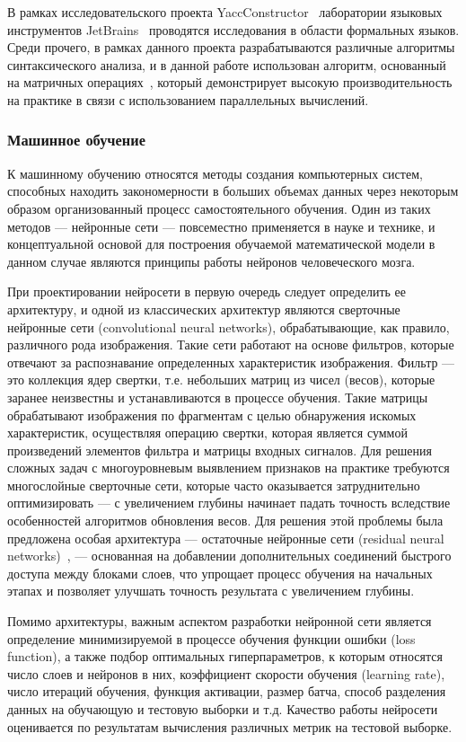 В рамках исследовательского проекта YaccConstructor~\cite{yacc} лаборатории языковых
инструментов JetBrains~\cite{jetbrains} проводятся исследования в области формальных языков. Среди прочего, в рамках данного проекта разрабатываются различные алгоритмы синтаксического анализа, и в данной работе использован алгоритм, основанный на матричных операциях~\cite{azimov2018context}, который демонстрирует высокую производительность на практике в связи с использованием параллельных вычислений.

\subsubsection{Машинное обучение}
К машинному обучению относятся методы создания компьютерных систем, способных находить закономерности в больших объемах данных через некоторым образом организованный процесс самостоятельного обучения. Один из таких методов --- нейронные сети --- повсеместно применяется в науке и технике, и концептуальной основой для построения обучаемой математической модели в данном случае являются принципы работы нейронов человеческого мозга.

При проектировании нейросети в первую очередь следует определить ее архитектуру, и одной из классических архитектур являются сверточные нейронные сети (convolutional neural networks), обрабатывающие, как правило, различного рода изображения. Такие сети работают на основе фильтров, которые отвечают за распознавание определенных характеристик изображения. Фильтр --- это коллекция ядер свертки, т.е. небольших матриц из чисел (весов), которые заранее неизвестны и устанавливаются в процессе обучения. Такие матрицы обрабатывают изображения по фрагментам с целью обнаружения искомых характеристик, осуществляя операцию свертки, которая является суммой произведений элементов фильтра и матрицы входных сигналов. Для решения сложных задач с многоуровневым выявлением признаков на практике требуются многослойные сверточные сети, которые часто оказывается затруднительно оптимизировать --- с увеличением глубины начинает падать точность вследствие особенностей алгоритмов обновления весов. Для решения этой проблемы была предложена особая архитектура --- остаточные нейронные сети (residual neural networks)~\cite{he2016deep}, --- основанная на добавлении дополнительных соединений быстрого доступа между блоками слоев, что упрощает процесс обучения на начальных этапах и позволяет улучшать точность результата с увеличением глубины. 

Помимо архитектуры, важным аспектом разработки нейронной сети является определение минимизируемой в процессе обучения функции ошибки (loss function), а также подбор оптимальных гиперпараметров, к которым относятся число слоев и нейронов в них, коэффициент скорости обучения (learning rate), число итераций обучения, функция активации, размер батча, способ разделения данных на обучающую и тестовую выборки и т.д. Качество работы нейросети оценивается по результатам вычисления различных метрик на тестовой выборке.

